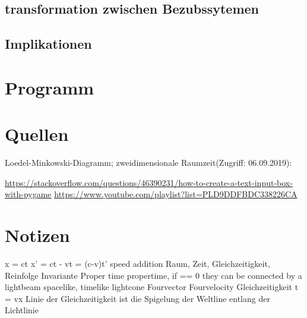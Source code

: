 \documentclass[12pt]{article}
\begin{document}
\subsection{transformation zwischen Bezubssytemen}

\subsection{Implikationen}
\section{Programm}



\section{Quellen}
Loedel-Minkowski-Diagramm; zweidimensionale Raumzeit(Zugriff: 06.09.2019):

\url{https://stackoverflow.com/questions/46390231/how-to-create-a-text-input-box-with-pygame}
\url{https://www.youtube.com/playlist?list=PLD9DDFBDC338226CA}
\section{Notizen}

x = ct
x' = ct - vt = (c-v)t'
speed addition
Raum, Zeit, Gleichzeitigkeit, Reinfolge
Invariante Proper time
propertime, if == 0 they can be connected by a lightbeam
spacelike, timelike
lightcone
Fourvector
Fourvelocity
Gleichzeitigkeit t = vx
Linie der Gleichzeitigkeit ist die Spigelung der Weltline entlang der Lichtlinie
\end{document}
